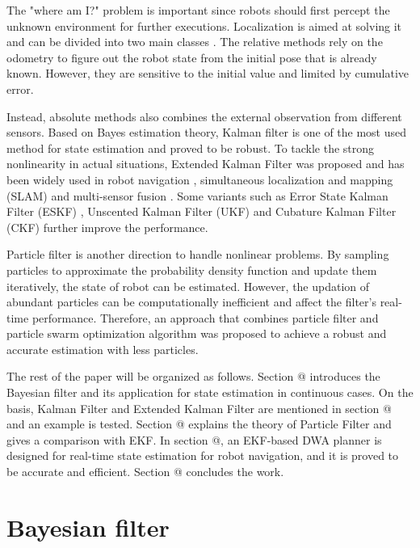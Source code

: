 \documentclass[conference]{IEEEtran}
\makeatletter
\newcommand{\Rmnum}[1]{\expandafter\@slowromancap\romannumeral #1@}
\makeatother
\begin{document}
	The "where am I?" problem is important since robots should first percept the unknown environment for further executions. Localization is aimed at solving it and can be divided into two main classes \cite{borenstein1997mobile}. The relative methods \cite{ahmed2005sharp} \cite{wang2022relative} rely on the odometry to figure out the robot state from the initial pose that is already known. However, they are sensitive to the initial value and limited by cumulative error. 
	
	Instead, absolute methods also combines the external observation from different sensors. Based on Bayes estimation theory, Kalman filter is one of the most used method for state estimation and proved to be robust. To tackle the strong nonlinearity in actual situations, Extended Kalman Filter was proposed and has been widely used in robot navigation \cite{chen2012ekf}, simultaneous localization and mapping (SLAM) \cite{barrau2015ekf} and multi-sensor fusion \cite{park2016navigation}. Some variants such as Error State Kalman Filter (ESKF) \cite{xu2022error}, Unscented Kalman Filter (UKF) \cite{han2015ukf} and Cubature Kalman Filter (CKF) \cite{xu2019mcc} further improve the performance. 
	
	Particle filter is another direction to handle nonlinear problems. By sampling particles to approximate the probability density function and update them iteratively, the state of robot can be estimated. However, the updation of abundant particles can be computationally inefficient and affect the filter's real-time performance. Therefore, an approach that combines particle filter and particle swarm optimization algorithm \cite{zhang2019improved} was proposed to achieve a robust and accurate estimation with less particles.
	
	The rest of the paper will be organized as follows. Section \Rmnum{2} introduces the Bayesian filter and its application for state estimation in continuous cases. On the basis, Kalman Filter and Extended Kalman Filter are mentioned in section \Rmnum{3} and an example is tested. Section \Rmnum{4} explains the theory of Particle Filter and gives a comparison with EKF. In section \Rmnum{5}, an EKF-based DWA planner is designed for real-time state estimation for robot navigation, and it is proved to be accurate and efficient. Section \Rmnum{6} concludes the work.
	
	\section{Bayesian filter}
	
\end{document}

